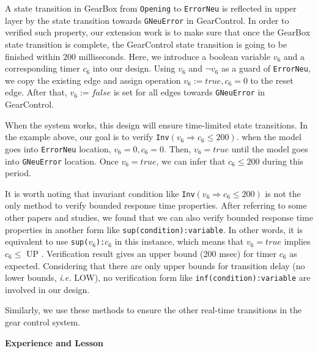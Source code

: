 \documentclass[a4paper]{article}
\begin{document}
\large{A state transition in \textsf{GearBox} from \texttt{Opening} to \texttt{ErrorNeu} is reflected in upper layer by the state transition towards \texttt{GNeuError} in \textsf{GearControl}. In order to verified such property, our extension work is to make sure that once the \textsf{GearBox} state transition is complete, the \textsf{GearControl} state transition is going to be finished within 200 milliseconds. Here, we introduce a boolean variable $v_6$ and a corresponding timer $c_6$ into our design. Using $v_6$ and $\lnot v_6$ as a guard of \texttt{ErrorNeu}, we copy the existing edge and assign operation $v_6:=true, c_6=0$ to the reset edge. After that, $v_6:=false$ is set for all edges towards \texttt{GNeuError} in \textsf{GearControl}. 

When the system works, this design will ensure time-limited state transitions. In the example above, our goal is to verify \texttt{Inv}$(v_6\Rightarrow c_6 \le 200)$. when the model goes into \texttt{ErrorNeu} location, $v_6=0,c_6=0$. Then, $v_6=true$ until the model goes into \texttt{GNeuError} location. Once $v_6=true$, we can infer that $c_6\le 200$ during this period. 

It is worth noting that invariant condition like \texttt{Inv}$(v_6\Rightarrow c_6 \le 200)$ is not the only method to verify bounded response time properties. After referring to some other papers and studies, we found that we can also verify bounded response time properties in another form like  \texttt{sup(condition):variable}. In other words, it is equivalent to use \texttt{sup($v_6$):$c_6$} in this instance, which means that $v_6=true$ implies $c_6 \le$ \normalsize{UP} \large. Verification result gives an upper bound (200 msec) for timer $c_6$ as expected. Considering that there are only upper bounds for transition delay (no lower bounds, \textit{i.e. }\small{LOW}\large), no verification form like \texttt{inf(condition):variable} are involved in our design.

Similarly, we use these methods to ensure the other real-time transitions in the gear control system.}



\vspace{2mm}
\begin{center}
\large\textbf{Experience and Lesson} \\
\end{center}
\end{document}
